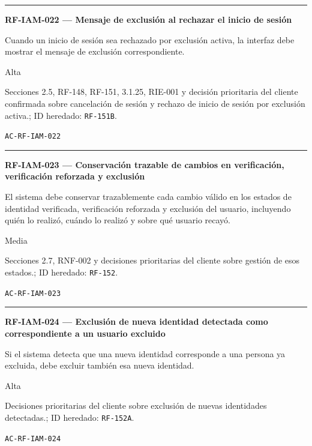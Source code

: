 \documentclass[10pt,letterpaper]{article}
\begin{document}
\vspace{0.25em}\hrule\vspace{0.65em}
\noindent\textbf{RF-IAM-022 --- Mensaje de exclusión al rechazar el inicio de sesión}\par
\begin{description}[style=nextline,leftmargin=3.15cm,labelwidth=2.8cm,font=\normalfont\bfseries]
\item[Obligación] Cuando un inicio de sesión sea rechazado por exclusión activa, la interfaz debe mostrar el mensaje de exclusión correspondiente.
\item[Prioridad] Alta
\item[Procedencia] Secciones 2.5, RF-148, RF-151, 3.1.25, RIE-001 y decisión prioritaria del cliente confirmada sobre cancelación de sesión y rechazo de inicio de sesión por exclusión activa.; ID heredado: \texttt{RF-151B}.
\item[Verificación] \texttt{AC-RF-IAM-022}
\end{description}
\vspace{0.25em}\hrule\vspace{0.65em}
\noindent\textbf{RF-IAM-023 --- Conservación trazable de cambios en verificación, verificación reforzada y exclusión}\par
\begin{description}[style=nextline,leftmargin=3.15cm,labelwidth=2.8cm,font=\normalfont\bfseries]
\item[Obligación] El sistema debe conservar trazablemente cada cambio válido en los estados de identidad verificada, verificación reforzada y exclusión del usuario, incluyendo quién lo realizó, cuándo lo realizó y sobre qué usuario recayó.
\item[Prioridad] Media
\item[Procedencia] Secciones 2.7, RNF-002 y decisiones prioritarias del cliente sobre gestión de esos estados.; ID heredado: \texttt{RF-152}.
\item[Verificación] \texttt{AC-RF-IAM-023}
\end{description}
\vspace{0.25em}\hrule\vspace{0.65em}
\noindent\textbf{RF-IAM-024 --- Exclusión de nueva identidad detectada como correspondiente a un usuario excluido}\par
\begin{description}[style=nextline,leftmargin=3.15cm,labelwidth=2.8cm,font=\normalfont\bfseries]
\item[Obligación] Si el sistema detecta que una nueva identidad corresponde a una persona ya excluida, debe excluir también esa nueva identidad.
\item[Prioridad] Alta
\item[Procedencia] Decisiones prioritarias del cliente sobre exclusión de nuevas identidades detectadas.; ID heredado: \texttt{RF-152A}.
\item[Verificación] \texttt{AC-RF-IAM-024}
\end{description}
\end{document}
